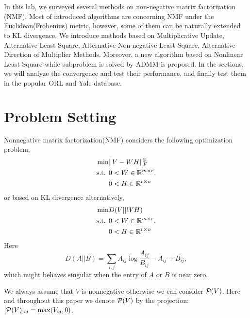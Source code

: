 \documentclass{article}
\begin{document}
	\maketitle
	\thispagestyle{fancy}
	\tableofcontents
	
	\section*{}


In this lab, we surveyed several methods on non-negative matrix factorization (NMF). Most of introduced algorithms are concerning NMF under the Euclidean(Frobenius) metric, however, some of them can be naturally extended to KL divergence. We introduce methods based on Multiplicative Update, Alternative Least Square, Alternative Non-negative Least Square, Alternative Direction of Multiplier Methods. Moreover, a new algorithm based on Nonlinear Least Square while subproblem is solved by ADMM is proposed. In the sections, we will analyze the convergence and test their performance, and finally test them in the popular ORL and Yale database.
\section{Problem Setting}
Nonnegative matrix factorization(NMF) considers the following optimization problem,
\begin{equation}
\begin{aligned}
\min& \|V-WH\|_F^2 \\
\st& 0<W\in \R^{m\times r}, \\ &0<H \in \R^{r \times n}
\end{aligned}
\end{equation}
or based on KL divergence alternatively,
\begin{equation}
\begin{aligned}
\min& D(V||WH) \\
\st& 0<W\in \R^{m\times r}, \\ &0<H \in \R^{r \times n}
\end{aligned}
\end{equation}
Here $$D(A||B) = \sum_{i,j}A_{ij}\log\frac{A_{ij}}{B_{ij}} - A_{ij} + B_{ij},$$
which might behaves singular when the entry of $A$ or $B$ is near zero. 

We always assume that $V$ is nonnegative otherwise we can consider $\P(V)$. Here and throughout this paper we denote $\P(V)$ by the projection: $[\P(V)]_{ij} = \max (V_{ij},0)$.
\end{document}
